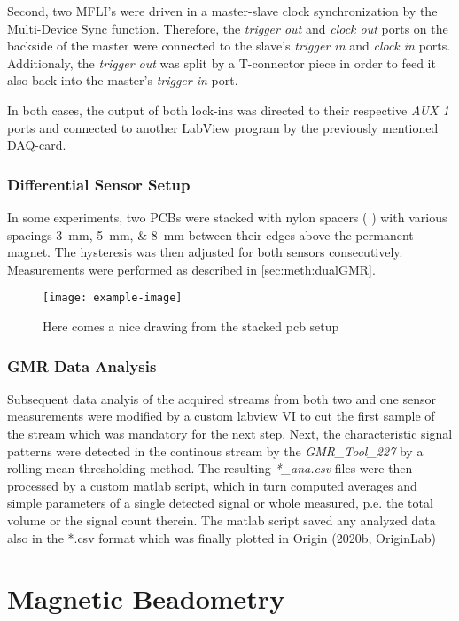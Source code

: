 Second, two MFLI's were driven in a master-slave clock synchronization by the Multi-Device Sync function. Therefore, the \textit{trigger out} and \textit{clock out} ports on the backside of the master were connected to the slave's \textit{trigger in} and \textit{clock in} ports. Additionaly, the \textit{trigger out} was split by a T-connector piece in order to feed it also back into the master's \textit{trigger in} port.

In both cases, the output of both lock-ins was directed to their respective \textit{AUX 1} ports and connected to another LabView program by the previously mentioned DAQ-card.

\subsubsection{Differential Sensor Setup}
In some experiments, two PCBs were stacked with nylon spacers (%
) with various spacings \SIlist{3;5;8}{\milli\meter} between their edges above the permanent magnet. The hysteresis was then adjusted for both sensors consecutively. Measurements were performed as described in \ref{sec:meth:dualGMR}.

\begin{figure}[h!]
	\texttt{[image: example-image]} 
	\caption{Here comes a nice drawing from the stacked pcb setup}
\end{figure}

\subsubsection{GMR Data Analysis}
Subsequent data analyis of the acquired streams from both two and one sensor measurements were modified by a custom labview VI to cut the first sample of the stream which was mandatory for the next step. Next, the characteristic signal patterns were detected in the continous stream by the \textit{GMR\_Tool\_227} by a rolling-mean thresholding method. The resulting \textit{*\_ana.csv} files were then processed by a custom matlab script, which in turn computed averages and simple parameters of a single detected signal or whole measured, p.e. the total volume or the signal count therein. The matlab script saved any analyzed data also in the *.csv format which was finally plotted in Origin (2020b, OriginLab)

\section{Magnetic Beadometry}

